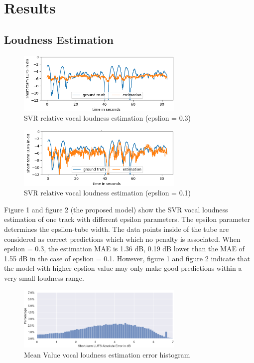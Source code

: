 \documentclass[conference]{IEEEtran}
\begin{document}
\section{Results}

\subsection{Loudness Estimation}



\FloatBarrier
\begin{figure}[h]
\includegraphics[width=8cm]{02 vox.png}
\centering
\caption{SVR relative vocal loudness estimation (epslion = 0.3)}
\end{figure}
\FloatBarrier

\FloatBarrier
\begin{figure}[h]
\includegraphics[width=8cm]{01 vox.png}
\centering
\caption{SVR relative vocal loudness estimation (epslion = 0.1)}
\end{figure}
\FloatBarrier
Figure 1 and figure 2 (the proposed model) show the SVR vocal loudness estimation of one track with different epsilon parameters. The epsilon parameter determines the epsilon-tube width. The data points inside of the tube are considered as correct predictions which which no penalty is associated. When epslion = 0.3, the estimation MAE is 1.36 dB, 0.19 dB lower than the MAE of 1.55 dB in the case of epslion = 0.1. However, figure 1 and figure 2 indicate that the model with higher epslion value may only make good predictions within a very small loudness range. 


\FloatBarrier
\begin{figure}[h]
\includegraphics[width=8cm]{Mean_histogram vox.png}
\centering
\caption{Mean Value vocal loudness estimation error histogram}
\end{figure}
\FloatBarrier
\end{document}
